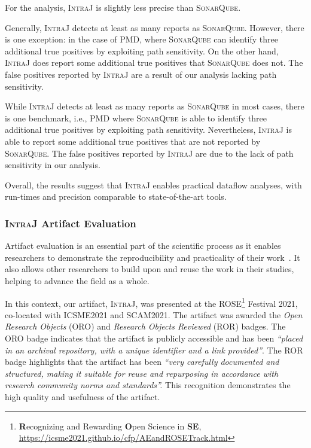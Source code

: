 For the  analysis, \textsc{IntraJ} is slightly less precise than
\textsc{SonarQube}.

Generally, \textsc{IntraJ} detects at least as many reports as \textsc{SonarQube}. 
However, there is one exception: in the case of \textsc{PMD}, where \textsc{SonarQube} 
can identify three additional true positives by exploiting path sensitivity.
On the other hand, \textsc{IntraJ} does report some additional true positives that \textsc{SonarQube} 
does not. The false positives reported by \textsc{IntraJ} are a result of our analysis 
lacking path sensitivity.

While \textsc{IntraJ} detects at least as many reports as \textsc{SonarQube} in most
cases, there is one benchmark, i.e., \textsc{PMD} where \textsc{SonarQube} is able to identify three 
additional true positives by exploiting path sensitivity.
Nevertheless, \textsc{IntraJ} is able to report some additional true positives that 
are not reported by \textsc{SonarQube}. The false positives reported by \textsc{IntraJ}
are due to the lack of path sensitivity in our analysis.

Overall, the results suggest that \textsc{IntraJ} enables practical dataflow analyses, 
with run-times and precision comparable to state-of-the-art tools.



\subsubsection{\textsc{IntraJ} Artifact Evaluation}
Artifact evaluation is an essential part of the scientific process as it enables
researchers to demonstrate the reproducibility and practicality of their work~\cite{KrishnamurthiArtifact2013}.
It also allows other researchers to build upon and reuse the work in their
studies, helping to advance the field as a whole.

In this context, our artifact, \textsc{IntraJ}, was presented at the
ROSE\footnote{\textbf{R}ecognizing and Rewarding \textbf{O}pen Science in \textbf{SE},
\url{https://icsme2021.github.io/cfp/AEandROSETrack.html}} Festival 2021,
co-located with ICSME2021 and SCAM2021. The artifact was awarded the \emph{Open Research Objects}
(ORO) and \emph{Research Objects Reviewed} (ROR) badges.
The ORO badge indicates that the artifact is publicly accessible and has been
\emph{``placed in an archival repository, with a unique identifier and a link provided''}.
The ROR badge highlights that the artifact has been
\emph{``very carefully documented and structured, making it suitable for reuse and repurposing
in accordance with research community norms and standards''.} This recognition
demonstrates the high quality and usefulness of the artifact.

